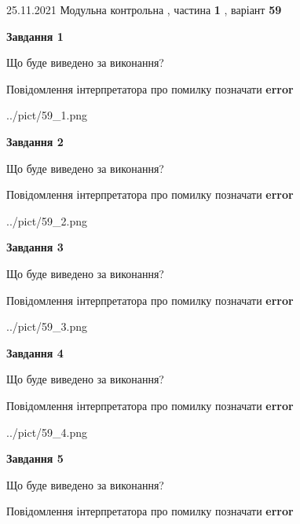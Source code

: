 \documentclass[10pt, ukrainian]{article}
\begin{document}
{25.11.2021 Модульна контрольна , частина \textbf { 1 }, варіант  \No \textbf { 59 }\par}
{
\begin {large}

{\begin {center}\textbf{Завдання 1}\end {center}}\par
Що буде виведено за виконання? \par
Повідомлення інтерпретатора про помилку позначати \textbf{error}

\begin{center}
	{../pict/59_1.png}
\end{center}
\newpage

{\begin {center}\textbf{Завдання 2}\end {center}}\par
Що буде виведено за виконання? \par
Повідомлення інтерпретатора про помилку позначати \textbf{error}

\begin{center}
	{../pict/59_2.png}
\end{center}
\newpage

{\begin {center}\textbf{Завдання 3}\end {center}}\par
Що буде виведено за виконання? \par
Повідомлення інтерпретатора про помилку позначати \textbf{error}

\begin{center}
	{../pict/59_3.png}
\end{center}
\newpage

{\begin {center}\textbf{Завдання 4}\end {center}}\par
Що буде виведено за виконання? \par
Повідомлення інтерпретатора про помилку позначати \textbf{error}

\begin{center}
	{../pict/59_4.png}
\end{center}
\newpage

{\begin {center}\textbf{Завдання 5}\end {center}}\par
Що буде виведено за виконання? \par
Повідомлення інтерпретатора про помилку позначати \textbf{error}


\end{large}}
\end{document}
